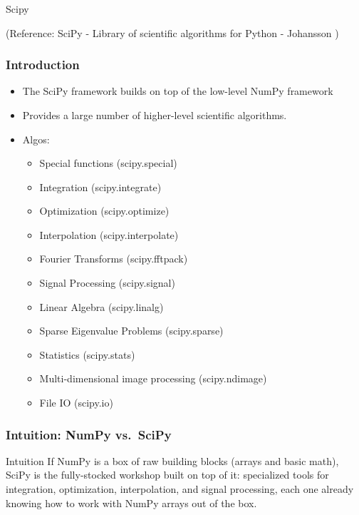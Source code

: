 \begin{frame}[fragile]\frametitle{}
\begin{center}
{\Large Scipy}

(Reference: 
SciPy - Library of scientific algorithms for Python - Johansson )
\end{center}
\end{frame}


\begin{frame}[fragile]\frametitle{Introduction}
 \begin{itemize}
  \item The SciPy framework builds on top of the low-level NumPy framework 
  \item Provides a large number of higher-level scientific algorithms. 
  \item Algos:
   \begin{itemize}
  \item Special functions (scipy.special)
  \item Integration (scipy.integrate)
  \item Optimization (scipy.optimize)
  \item Interpolation (scipy.interpolate)
  \item Fourier Transforms (scipy.fftpack)
  \item Signal Processing (scipy.signal)
  \item Linear Algebra (scipy.linalg)
  \item Sparse Eigenvalue Problems (scipy.sparse)
  \item Statistics (scipy.stats)
  \item Multi-dimensional image processing (scipy.ndimage)
  \item File IO (scipy.io)
 \end{itemize}
 \end{itemize}
\end{frame}

\begin{frame}[fragile]\frametitle{Intuition: NumPy vs.\ SciPy}
\begin{block}{Intuition}
If NumPy is a box of raw building blocks (arrays and basic math), SciPy is the fully-stocked
workshop built on top of it: specialized tools for integration, optimization, interpolation,
and signal processing, each one already knowing how to work with NumPy arrays out of the box.
\end{block}
\end{frame}



